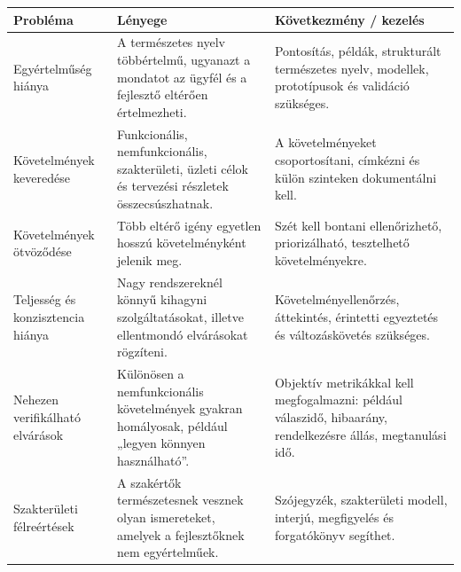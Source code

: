 \begin{tabularx}{\textwidth}{L{33mm}X X}
\toprule
\textbf{Probléma} & \textbf{Lényege} & \textbf{Következmény / kezelés} \\
\midrule
Egyértelműség hiánya & A természetes nyelv többértelmű, ugyanazt a mondatot az ügyfél és a fejlesztő eltérően értelmezheti. & Pontosítás, példák, strukturált természetes nyelv, modellek, prototípusok és validáció szükséges. \\
Követelmények keveredése & Funkcionális, nemfunkcionális, szakterületi, üzleti célok és tervezési részletek összecsúszhatnak. & A követelményeket csoportosítani, címkézni és külön szinteken dokumentálni kell. \\
Követelmények ötvöződése & Több eltérő igény egyetlen hosszú követelményként jelenik meg. & Szét kell bontani ellenőrizhető, priorizálható, tesztelhető követelményekre. \\
Teljesség és konzisztencia hiánya & Nagy rendszereknél könnyű kihagyni szolgáltatásokat, illetve ellentmondó elvárásokat rögzíteni. & Követelményellenőrzés, áttekintés, érintetti egyeztetés és változáskövetés szükséges. \\
Nehezen verifikálható elvárások & Különösen a nemfunkcionális követelmények gyakran homályosak, például „legyen könnyen használható”. & Objektív metrikákkal kell megfogalmazni: például válaszidő, hibaarány, rendelkezésre állás, megtanulási idő. \\
Szakterületi félreértések & A szakértők természetesnek vesznek olyan ismereteket, amelyek a fejlesztőknek nem egyértelműek. & Szójegyzék, szakterületi modell, interjú, megfigyelés és forgatókönyv segíthet. \\
\bottomrule
\end{tabularx}

